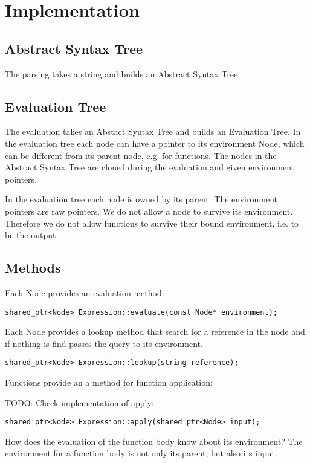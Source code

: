 \documentclass[a4paper,12pt]{article}
\begin{document}
\section{Implementation}

\subsection{Abstract Syntax Tree}
The parsing takes a string and builds an Abstract Syntax Tree.

\subsection{Evaluation Tree}

The evaluation takes an Abstact Syntax Tree and builds an Evaluation Tree. In the evaluation tree each node can have a pointer to its environment Node, which can be different from its parent node, e.g. for functions. The nodes in the Abstract Syntax Tree are cloned during the evaluation and given environment pointers.

In the evaluation tree each node is owned by its parent. The environment pointers are raw pointers. We do not allow a node to survive its environment. Therefore we do not allow functions to survive their bound environment, i.e. to be the output.

\subsection{Methods}

Each Node provides an evaluation method:
\begin{verbatim}
shared_ptr<Node> Expression::evaluate(const Node* environment);
\end{verbatim}
Each Node provides a lookup method that search for a reference in the node and if nothing is find passes the query to its environment.
\begin{verbatim}
shared_ptr<Node> Expression::lookup(string reference);
\end{verbatim}
Functions provide an a method for function application:

TODO: Check implementation of apply:
\begin{verbatim}
shared_ptr<Node> Expression::apply(shared_ptr<Node> input);
\end{verbatim}
How does the evaluation of the function body know about its environment?
The environment for a function body is not only its parent, but also its input.
\end{document}
